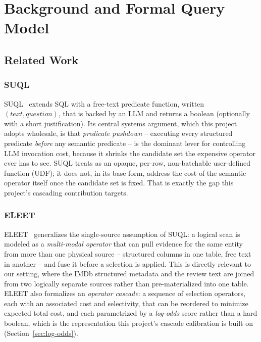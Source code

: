 \chapter{Background and Formal Query Model}
\label{chap:background}

\section{Related Work}

\subsection{SUQL}
SUQL~\cite{suql} extends SQL with a free-text predicate function,
written \answerfn{}$(\mathit{text}, \mathit{question})$, that is backed
by an LLM and returns a boolean (optionally with a short justification).
Its central systems argument, which this project adopts wholesale, is
that \emph{predicate pushdown} -- executing every structured predicate
\emph{before} any semantic predicate -- is the dominant lever for
controlling LLM invocation cost, because it shrinks the candidate set
the expensive operator ever has to see. SUQL treats \answerfn{} as an
opaque, per-row, non-batchable user-defined function (UDF); it does not,
in its base form, address the cost of the semantic operator itself once
the candidate set is fixed. That is exactly the gap this project's
cascading contribution targets.

\subsection{ELEET}
ELEET~\cite{eleet} generalizes the single-source assumption of SUQL: a
logical scan is modeled as a \emph{multi-modal operator} that can pull
evidence for the same entity from more than one physical source --
structured columns in one table, free text in another -- and fuse it
before a selection is applied. This is directly relevant to our setting,
where the IMDb structured metadata and the review text are joined from
two logically separate sources rather than pre-materialized into one
table. ELEET also formalizes an \emph{operator cascade}: a sequence of
selection operators, each with an associated cost and selectivity, that
can be reordered to minimize expected total cost, and each parametrized
by a \emph{log-odds} score rather than a hard boolean, which is the
representation this project's cascade calibration is built on
(Section~\ref{sec:log-odds}).

